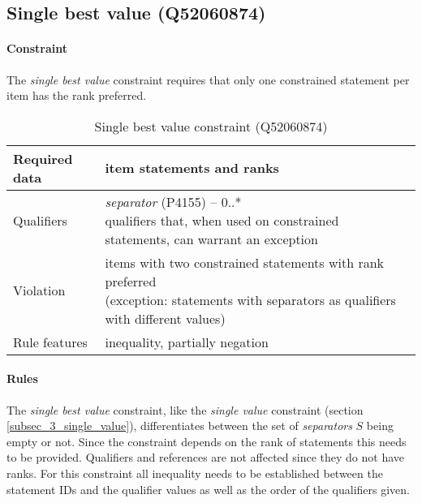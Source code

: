 \documentclass[hyperref,bachelorofscience,fleqn]{cgvpub}
\begin{document}
\subsection{Single best value (Q52060874)}
\paragraph{Constraint}
The \emph{single best value} constraint requires that only one constrained statement per item has the rank preferred.

\begin{table}[H]
\caption{Single best value constraint (Q52060874)}
\begin{tabularx}{\textwidth}{ ll X}
\hline
Required data & item statements and ranks \\
\hline
Qualifiers & \makecell{\emph{separator} (P4155) -- 0..* \\ qualifiers that, when used on constrained statements, can warrant an exception } \\
\hline
Violation & \makecell{items with two constrained statements with rank preferred \\ (exception: statements with separators as qualifiers with different values)} \\
\hline
Rule features & inequality, partially negation \\
\hline
\end{tabularx}
\end{table}

\paragraph{Rules}
The \emph{single best value} constraint, like the \emph{single value} constraint (section \ref{subsec_3_single_value}), differentiates between the set of \emph{separators} \(S\) being empty or not. Since the constraint depends on the rank of statements this needs to be provided. Qualifiers and references are not affected since they do not have ranks. For this constraint all inequality needs to be established between the statement IDs and the qualifier values as well as the order of the qualifiers given.\\
\end{document}
